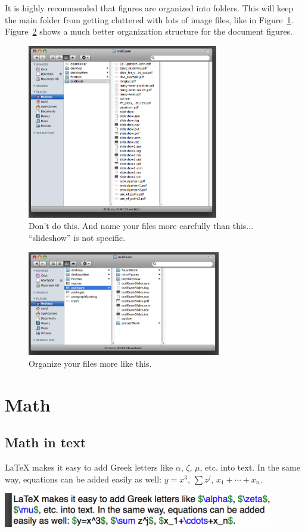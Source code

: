 \documentclass[11pt]{article} %
\begin{document}
It is highly recommended that figures are organized into folders. This will keep the main folder from getting cluttered with lots of image files, like in Figure~\ref{messyFolder}. Figure~\ref{cleanFolder} shows a much better organization structure for the document figures. \\
\begin{figure}[htbp]
   \centering
   \includegraphics[height=3.0in]{figures/messyFolder}
   \caption{Don't do this. And name your files more carefully than this... ``slideshow'' is not specific.}
   \label{messyFolder}
\end{figure}
\begin{figure}[htbp]
   \centering
   \includegraphics[height=1.8in]{figures/cleanFolder}
   \caption{Organize your files more like this.}
   \label{cleanFolder}
\end{figure}


\section{Math}
\label{math}

\subsection{Math in text}

LaTeX makes it easy to add Greek letters like $\alpha$, $\zeta$,
$\mu$, etc. into text. In the same way, equations can be added
easily as well: $y=x^3$, $\sum z^j$, $x_1+\cdots+x_n$.
\begin{center}
\includegraphics[height=1.5cm]{figures/mathInText}
\end{center}
\end{document}
